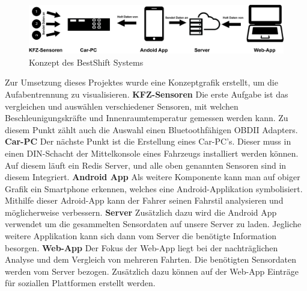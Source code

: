 
\begin{figure}[!htb]
	\centering
	\includegraphics[scale=0.6]{images/konzept}
	\caption{Konzept des BestShift Systems}
\end{figure}

Zur Umsetzung dieses Projektes wurde eine Konzeptgrafik erstellt, um die Aufabentrennung zu visualisieren.
\nextline
\textbf{KFZ-Sensoren\newline}
Die erste Aufgabe ist das vergleichen und auswählen verschiedener Sensoren, mit welchen Beschleunigungskräfte und Innenraumtemperatur gemessen werden kann. Zu diesem Punkt zählt auch die Auswahl einen Bluetoothfähigen OBDII Adapters.
\nextline
\textbf{Car-PC\newline}
Der nächste Punkt ist die Erstellung eines Car-PC's. Dieser muss in einen DIN-Schacht der Mittelkonsole eines Fahrzeugs installiert werden können. Auf diesem läuft ein Redis Server, und alle oben genannten Sensoren sind in diesem Integriert.
\nextline
\textbf{Android App\newline}
Als weitere Komponente kann man auf obiger Grafik ein Smartphone erkennen, welches eine Android-Applikation symbolisiert. Mithilfe dieser Adroid-App kann der Fahrer seinen Fahrstil analysieren und möglicherweise verbessern.
\nextline
\textbf{Server\newline}
Zusätzlich dazu wird die Android App verwendet um die gesammelten Sensordaten auf unsere Server zu laden. Jegliche weitere Applikation kann sich dann vom Server die benötigte Information besorgen.
\nextline
\textbf{Web-App\newline}
Der Fokus der Web-App liegt bei der nachträglichen Analyse und dem Vergleich von mehreren Fahrten. Die benötigten Sensordaten werden vom Server bezogen. Zusätzlich dazu können auf der Web-App Einträge für soziallen Plattformen erstellt werden.